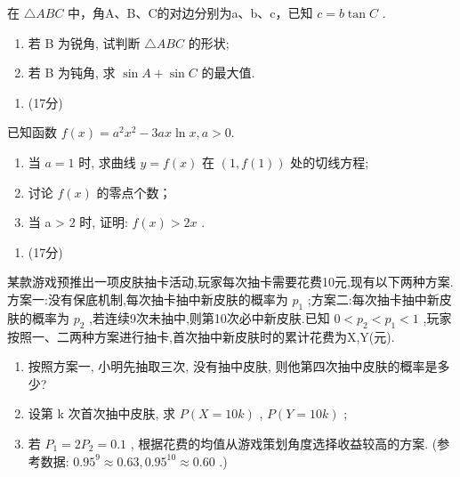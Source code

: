 \documentclass[UTF8,12pt,a4paper]{ctexart}
\renewcommand{\labelenumi}{\arabic{enumi}.}
\providecommand{\tightlist}{%
  \setlength{\itemsep}{0pt}\setlength{\parskip}{0pt}}
\begin{document}
在 \(\triangle ABC\) 中，角A、B、C的对边分别为a、b、c，已知 \(c=b\tan C\) .

\begin{enumerate}
\def\labelenumi{(\arabic{enumi})}
\item
  若 B 为锐角, 试判断 \(\triangle ABC\) 的形状;
\item
  若 B 为钝角, 求 \(\sin A + \sin C\) 的最大值.
\end{enumerate}

\begin{enumerate}
\def\labelenumi{\arabic{enumi}.}
\setcounter{enumi}{17}
\tightlist
\item
  (17分)
\end{enumerate}

已知函数 \(f(x)=a^{2}x^{2}-3ax\ln x,a>0.\)

\begin{enumerate}
\def\labelenumi{(\arabic{enumi})}
\item
  当 \(a = 1\) 时, 求曲线 \(y = f(x)\) 在 \((1, f(1))\) 处的切线方程;
\item
  讨论 \(f(x)\) 的零点个数；
\item
  当 a \textgreater{} 2 时, 证明: \(f(x) > 2x\) .
\end{enumerate}

\begin{enumerate}
\def\labelenumi{\arabic{enumi}.}
\setcounter{enumi}{18}
\tightlist
\item
  (17分)
\end{enumerate}

某款游戏预推出一项皮肤抽卡活动,玩家每次抽卡需要花费10元,现有以下两种方案.方案一:没有保底机制,每次抽卡抽中新皮肤的概率为 \(p_{1}\) ;方案二:每次抽卡抽中新皮肤的概率为 \(p_{2}\) ,若连续9次未抽中,则第10次必中新皮肤.已知 \(0<p_{2}<p_{1}<1\) ,玩家按照一、二两种方案进行抽卡,首次抽中新皮肤时的累计花费为X,Y(元).

\begin{enumerate}
\def\labelenumi{(\arabic{enumi})}
\item
  按照方案一, 小明先抽取三次, 没有抽中皮肤, 则他第四次抽中皮肤的概率是多少?
\item
  设第 k 次首次抽中皮肤, 求 \(P(X=10k)\) , \(P(Y=10k)\) ;
\item
  若 \(P_{1} = 2P_{2} = 0.1\) , 根据花费的均值从游戏策划角度选择收益较高的方案. (参考数据: \(0.95^{9} \approx 0.63, 0.95^{10} \approx 0.60\) .)
\end{enumerate}

\clearpage
\end{document}
